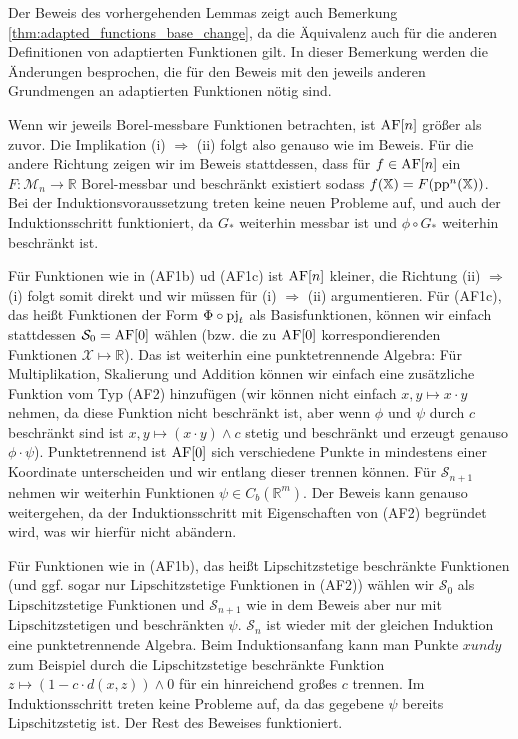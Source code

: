     \begin{remark}
        Der Beweis des vorhergehenden Lemmas zeigt auch Bemerkung \ref{thm:adapted_functions_base_change}, da die Äquivalenz auch für die anderen Definitionen von adaptierten Funktionen gilt. In dieser Bemerkung werden die Änderungen besprochen, die für den Beweis mit den jeweils anderen Grundmengen an adaptierten Funktionen nötig sind.
        
        Wenn wir jeweils Borel-messbare Funktionen betrachten, ist $\operatorname{AF}[n]$ größer als zuvor. Die Implikation (i) $\Rightarrow$ (ii) folgt also genauso wie im Beweis. Für die andere Richtung zeigen wir im Beweis stattdessen, dass für $f \in \operatorname{AF}[n]$ ein $F: \mathcal{M}_n \rightarrow \mathbb{R}$ Borel-messbar und beschränkt existiert sodass $f(\mathbb{X})=F(\operatorname{pp}^n(\mathbb{X}))$. Bei der Induktionsvoraussetzung treten keine neuen Probleme auf, und auch der Induktionsschritt funktioniert, da $G_*$ weiterhin messbar ist und $\phi \circ G_*$ weiterhin beschränkt ist.

        Für Funktionen wie in (AF1b) ud (AF1c) ist $\operatorname{AF}[n]$ kleiner, die Richtung (ii) $\Rightarrow$ (i) folgt somit direkt und wir müssen für (i) $\Rightarrow$ (ii) argumentieren. Für (AF1c), das heißt Funktionen der Form $\Phi \circ \operatorname{pj}_t$ als Basisfunktionen, können wir einfach stattdessen $\mathcal{S}_0 = \operatorname{AF}[0]$ wählen (bzw. die zu $\operatorname{AF}[0]$ korrespondierenden Funktionen $\mathcal{X} \mapsto \mathbb{R}$). Das ist weiterhin eine punktetrennende Algebra: Für Multiplikation, Skalierung und Addition können wir einfach eine zusätzliche Funktion vom Typ (AF2) hinzufügen (wir können nicht einfach $x,y\mapsto x\cdot y$ nehmen, da diese Funktion nicht beschränkt ist, aber wenn $\phi$ und $\psi$ durch $c$ beschränkt sind ist $x,y\mapsto (x\cdot y) \wedge c$ stetig und beschränkt und erzeugt genauso $\phi \cdot \psi$). 
        Punktetrennend ist $\operatorname{AF}[0]$ sich verschiedene Punkte in mindestens einer Koordinate unterscheiden und wir entlang dieser trennen können. Für $\mathcal{S}_{n+1}$ nehmen wir weiterhin Funktionen $\psi \in C_b(\mathbb{R}^m)$. Der Beweis kann genauso weitergehen, da der Induktionsschritt mit Eigenschaften von (AF2) begründet wird, was wir hierfür nicht abändern.

        Für Funktionen wie in (AF1b), das heißt Lipschitzstetige beschränkte Funktionen (und ggf. sogar nur Lipschitzstetige Funktionen in (AF2)) wählen wir $\mathcal{S}_0$ als Lipschitzstetige Funktionen und $\mathcal{S}_{n+1}$ wie in dem Beweis aber nur mit Lipschitzstetigen und beschränkten $\psi$. $\mathcal{S}_n$ ist wieder mit der gleichen Induktion eine punktetrennende Algebra. Beim Induktionsanfang kann man Punkte $x und y$ zum Beispiel durch die Lipschitzstetige beschränkte Funktion $z \mapsto (1 - c\cdot d(x,z)) \wedge 0$ für ein hinreichend großes $c$ trennen. Im Induktionsschritt treten keine Probleme auf, da das gegebene $\psi$ bereits Lipschitzstetig ist. Der Rest des Beweises funktioniert. 

    \end{remark}

